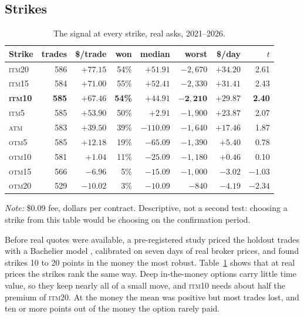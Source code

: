 \documentclass[12pt,letterpaper]{article}
\newcommand{\tabnotes}[1]{\par\vspace{5pt}\parbox{\linewidth}{\footnotesize\setlength{\parindent}{0pt}\textit{Note:} #1}\par}
\newcommand{\ITM}[1]{\textsc{itm}#1}
\newcommand{\OTM}[1]{\textsc{otm}#1}
\newcommand{\ATM}{\textsc{atm}}
\begin{document}
\subsection{Strikes}
\label{sec:strikes}

\begin{table}[htbp]
\centering
\caption{The signal at every strike, real asks, 2021--2026.}
\label{tab:rpstrikes}
\begin{tabular}{lrrrrrrr}
\toprule
Strike & trades & \$/trade & won & median & worst & \$/day & $t$ \\
\midrule
\ITM{20} & 586 & $+77.15$ & 54\% & $+51.91$ & $-2{,}670$ & $+34.20$ & 2.61 \\
\ITM{15} & 584 & $+71.00$ & 55\% & $+52.41$ & $-2{,}330$ & $+31.41$ & 2.43 \\
\textbf{\ITM{10}} & \textbf{585} & $\mathbf{+67.46}$ & \textbf{54\%} & $\mathbf{+44.91}$ & $\mathbf{-2{,}210}$ & $\mathbf{+29.87}$ & \textbf{2.40} \\
\ITM{5} & 585 & $+53.90$ & 50\% & $+2.91$ & $-1{,}900$ & $+23.87$ & 2.07 \\
\ATM & 583 & $+39.50$ & 39\% & $-110.09$ & $-1{,}640$ & $+17.46$ & 1.87 \\
\OTM{5} & 585 & $+12.18$ & 19\% & $-65.09$ & $-1{,}390$ & $+5.40$ & 0.78 \\
\OTM{10} & 581 & $+1.04$ & 11\% & $-25.09$ & $-1{,}180$ & $+0.46$ & 0.10 \\
\OTM{15} & 566 & $-6.96$ & 5\% & $-15.09$ & $-1{,}000$ & $-3.02$ & $-1.03$ \\
\OTM{20} & 529 & $-10.02$ & 3\% & $-10.09$ & $-840$ & $-4.19$ & $-2.34$ \\
\bottomrule
\end{tabular}
\tabnotes{\$0.09 fee, dollars per contract. Descriptive, not a second test:
choosing a strike from this table would be choosing on the confirmation period.}
\end{table}

Before real quotes were available, a pre-registered study priced the holdout
trades with a Bachelier model \citep{bachelier1900}, calibrated on seven days of
real broker prices, and found strikes 10 to 20 points in the money the most
robust. Table~\ref{tab:rpstrikes} shows that at real prices the strikes rank the
same way. Deep in-the-money options carry little time value, so they keep nearly all of a
small move, and \ITM{10} needs about half the premium of \ITM{20}. At the money the mean was positive but most trades lost, and ten or more
points out of the money the option rarely paid.
\end{document}
